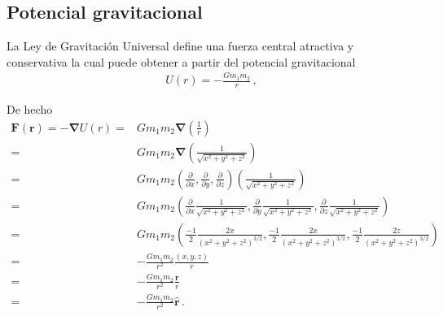 
\subsection{Potencial gravitacional}
\begin{frame}
La Ley de Gravitación Universal define una fuerza central atractiva y conservativa la cual puede obtener a partir del potencial gravitacional
\begin{align*}
  U(r)=-\frac{Gm_1m_2}{r}\,,
\end{align*}
\end{frame}

De hecho 
\begin{align*}
\mathbf{F}(\mathbf{r})=-\boldsymbol{\nabla}U(r)
=&Gm_1m_2\boldsymbol{\nabla}\left(\frac{1}{r}\right)\nonumber\\
=&Gm_1m_2\boldsymbol{\nabla}\left(\frac{1}{\sqrt{x^2+y^2+z^2}}\right)\nonumber\\
=&Gm_1m_2\left(\frac{\partial}{\partial x},\frac{\partial}{\partial y},\frac{\partial}{\partial z}\right)\left(\frac{1}{\sqrt{x^2+y^2+z^2}}\right)\nonumber\\
=&Gm_1m_2\left(\frac{\partial}{\partial x}\frac{1}{\sqrt{x^2+y^2+z^2}},\frac{\partial}{\partial y}\frac{1}{\sqrt{x^2+y^2+z^2}},\frac{\partial}{\partial z}\frac{1}{\sqrt{x^2+y^2+z^2}}\right)\nonumber\\
=&Gm_1m_2\left(\frac{-1}{2}\frac{2x}{(x^2+y^2+z^2)^{3/2}},\frac{-1}{2}\frac{2x}{(x^2+y^2+z^2)^{3/2}},\frac{-1}{2}\frac{2z}{(x^2+y^2+z^2)^{3/2}}\right)\nonumber\\
=&-\frac{Gm_1m_2}{r^2}\frac{(x,y,z)}{r}\nonumber\\
=&-\frac{Gm_1m_2}{r^2}\frac{\mathbf{r}}{r}\nonumber\\
=&-\frac{Gm_1m_2}{r^2}\hat{\mathbf{r}}\,.
\end{align*}

